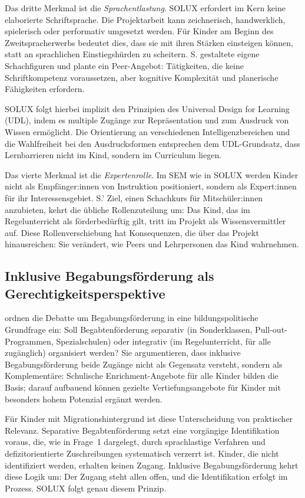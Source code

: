 \documentclass[ngerman, a4paper]{article}
\begin{document}
Das dritte Merkmal ist die \textit{Sprachentlastung}. SOLUX erfordert im Kern keine
elaborierte Schriftsprache. Die Projektarbeit kann zeichnerisch, handwerklich,
spielerisch oder performativ umgesetzt werden. Für Kinder am Beginn des
Zweitspracherwerbs bedeutet dies, dass sie mit ihren Stärken einsteigen können,
statt an sprachlichen Einstiegshürden zu scheitern. S. gestaltete eigene
Schachfiguren und plante ein Peer-Angebot: Tätigkeiten, die keine Schriftkompetenz
voraussetzen, aber kognitive Komplexität und planerische Fähigkeiten erfordern.

SOLUX folgt hierbei implizit den Prinzipien des Universal Design for Learning
(UDL), indem es multiple Zugänge zur Repräsentation und zum Ausdruck von Wissen
ermöglicht. Die Orientierung an verschiedenen Intelligenzbereichen und die
Wahlfreiheit bei den Ausdrucksformen entsprechen dem UDL-Grundsatz, dass
Lernbarrieren nicht im Kind, sondern im Curriculum liegen.

Das vierte Merkmal ist die \textit{Expertenrolle}. Im SEM wie in SOLUX werden Kinder
nicht als Empfänger:innen von Instruktion positioniert, sondern als Expert:innen
für ihr Interessensgebiet. S.' Ziel, einen Schachkurs für Mitschüler:innen
anzubieten, kehrt die übliche Rollenzuteilung um: Das Kind, das im Regelunterricht
als förderbedürftig gilt, tritt im Projekt als Wissensvermittler auf. Diese
Rollenverschiebung hat Konsequenzen, die über das Projekt hinausreichen: Sie
verändert, wie Peers und Lehrpersonen das Kind wahrnehmen.

\subsection{Inklusive Begabungsförderung als Gerechtigkeitsperspektive}

\textcite{weigand2021separativ} ordnen die Debatte um Begabungsförderung in eine bildungspolitische
Grundfrage ein: Soll Begabtenförderung separativ (in Sonderklassen, Pull-out-Programmen,
Spezialschulen) oder integrativ (im Regelunterricht, für alle zugänglich) organisiert
werden? Sie argumentieren, dass inklusive Begabungsförderung beide Zugänge nicht als
Gegensatz versteht, sondern als Komplementäre: Schulische Enrichment-Angebote für alle
Kinder bilden die Basis; darauf aufbauend können gezielte Vertiefungsangebote für
Kinder mit besonders hohem Potenzial ergänzt werden.

Für Kinder mit Migrationshintergrund ist diese Unterscheidung von praktischer
Relevanz. Separative Begabtenförderung setzt eine vorgängige Identifikation voraus,
die, wie in Frage~1 dargelegt, durch sprachlastige Verfahren und defizitorientierte
Zuschreibungen systematisch verzerrt ist. Kinder, die nicht identifiziert werden,
erhalten keinen Zugang. Inklusive Begabungsförderung kehrt diese Logik um: Der
Zugang steht allen offen, und die Identifikation erfolgt im Prozess. SOLUX folgt
genau diesem Prinzip.
\end{document}
